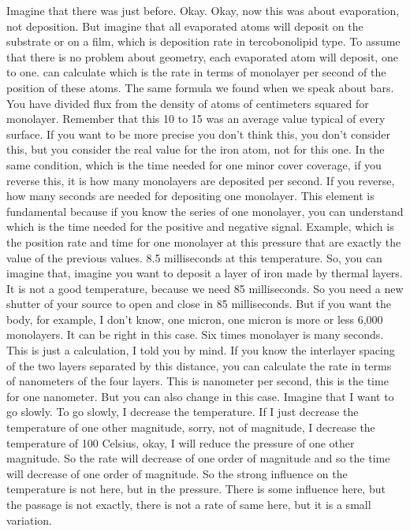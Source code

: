 Imagine that there was just before. Okay. Okay, now this was about evaporation, not deposition. But imagine that all evaporated atoms will deposit on the substrate or on a film, which is deposition rate in tercobonolipid type. To assume that there is no problem about geometry, each evaporated atom will deposit, one to one. can calculate which is the rate in terms of monolayer per second of the position of these atoms. The same formula we found when we speak about bars. You have divided flux from the density of atoms of centimeters squared for monolayer. Remember that this 10 to 15 was an average value typical of every surface. If you want to be more precise you don't think this, you don't consider this, but you consider the real value for the iron atom, not for this one. In the same condition, which is the time needed for one minor cover coverage, if you reverse this, it is how many monolayers are deposited per second. If you reverse, how many seconds are needed for depositing one monolayer. This element is fundamental because if you know the series of one monolayer, you can understand which is the time needed for the positive and negative signal. Example, which is the position rate and time for one monolayer at this pressure that are exactly the value of the previous values. 8.5 milliseconds at this temperature. So, you can imagine that, imagine you want to deposit a layer of iron made by thermal layers. It is not a good temperature, because we need 85 milliseconds. So you need a new shutter of your source to open and close in 85 milliseconds. But if you want the body, for example, I don't know, one micron, one micron is more or less 6,000 monolayers. It can be right in this case. Six times monolayer is many seconds. This is just a calculation, I told you by mind. If you know the interlayer spacing of the two layers separated by this distance, you can calculate the rate in terms of nanometers of the four layers. This is nanometer per second, this is the time for one nanometer. But you can also change in this case. Imagine that I want to go slowly. To go slowly, I decrease the temperature. If I just decrease the temperature of one other magnitude, sorry, not of magnitude, I decrease the temperature of 100 Celsius, okay, I will reduce the pressure of one other magnitude. So the rate will decrease of one order of magnitude and so the time will decrease of one order of magnitude. So the strong influence on the temperature is not here, but in the pressure. There is some influence here, but the passage is not exactly, there is not a rate of same here, but it is a small variation.
